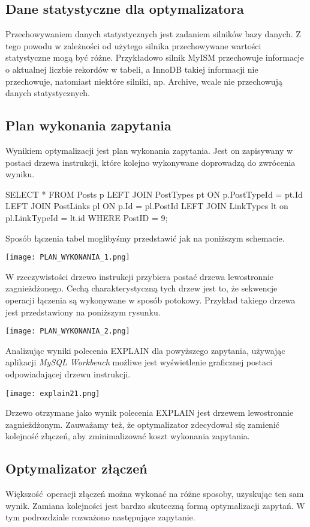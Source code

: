 \subsection{Dane statystyczne dla optymalizatora}
Przechowywaniem danych statystycznych jest zadaniem silników bazy danych. Z tego powodu w zależności od użytego silnika przechowywane wartości statystyczne mogą być różne. Przykładowo silnik MyISM przechowuje informacje o aktualnej liczbie rekordów w tabeli, a InnoDB takiej informacji nie przechowuje, natomiast niektóre silniki, np. Archive, wcale nie przechowują danych statystycznych.

\subsection{Plan wykonania zapytania}
Wynikiem optymalizacji jest plan wykonania zapytania. Jest on zapisywany w postaci drzewa instrukcji, które kolejno wykonywane doprowadzą do zwrócenia wyniku.
\begin{spverbatim}
	SELECT * FROM Posts p LEFT JOIN PostTypes pt ON p.PostTypeId = pt.Id LEFT JOIN PostLinks pl ON p.Id = pl.PostId LEFT JOIN LinkTypes lt on pl.LinkTypeId = lt.id WHERE PostID = 9;
\end{spverbatim}
Sposób łączenia tabel moglibyśmy przedstawić jak na poniższym schemacie.
 \begin{center}
 	\texttt{[image: PLAN\_WYKONANIA\_1.png]} 
 \end{center}
W rzeczywistości drzewo instrukcji przybiera postać drzewa lewostronnie zagnieżdżonego. Cechą charakterystyczną tych drzew jest to, że sekwencje operacji łączenia są wykonywane w sposób potokowy. Przykład takiego drzewa jest przedstawiony na poniższym rysunku.
\begin{center}
	\texttt{[image: PLAN\_WYKONANIA\_2.png]} 
\end{center}
Analizując wyniki polecenia EXPLAIN dla powyższego zapytania, używając aplikacji \textit{MySQL Workbench} możliwe jest wyświetlenie graficznej postaci odpowiadającej drzewu instrukcji.
\begin{center}
	\texttt{[image: explain21.png]} 
\end{center}
Drzewo otrzymane jako wynik polecenia EXPLAIN jest drzewem lewostronnie zagnieżdżonym. Zauważamy też, że optymalizator zdecydował się zamienić kolejność złączeń, aby zminimalizować koszt wykonania zapytania.

\subsection{Optymalizator złączeń}
Większość operacji złączeń można wykonać na różne sposoby, uzyskując ten sam wynik. Zamiana kolejności jest bardzo skuteczną formą optymalizacji zapytań. W tym podrozdziale rozważono następujące zapytanie.

